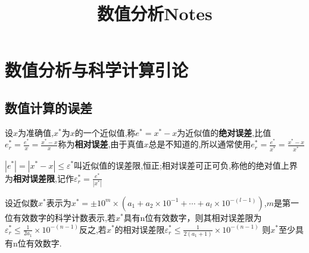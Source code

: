 \documentclass[10pt]{yerbaformat}
\title{数值分析Notes}
\date{}
\begin{document}
\maketitle
\tableofcontents
\footnotesize
\section{数值分析与科学计算引论}
\subsection{数值计算的误差}

\begin{definition}[绝对误差]
    设$x$为准确值,$x^{*}$为$x$的一个近似值,称$e^{*}=x^{*}-x$为近似值的\textbf{绝对误差},比值$e_{r}^{*}=\frac{e^{*}}{x}=\frac{x^{*}-x}{x}$称为\textbf{相对误差},由于真值$x$总是不知道的,所以通常使用$e_{r}^{*}=\frac{e^{*}}{x^{*}}=\frac{x^{*}-x}{x^{*}}$
\end{definition}

\begin{definition}[误差限]
    $\left|e^{*}\right|=\left|x^{*}-x\right|\leq\varepsilon^{*}$叫近似值的误差限,恒正;相对误差可正可负,称他的绝对值上界为\textbf{相对误差限},记作$\varepsilon_{r}^{*}=\frac{e^{*}}{\left|x^{*}\right|}$
\end{definition}

\begin{theorem}[有效数字与相对误差]
    设近似数$x^{*}$表示为$x^{*}=\pm10^{m}\times\left(a_{1}+a_{2}\times10^{-1}+\cdots+a_{l}\times10^{-(l-1)}\right)$,$m$是第一位有效数字的科学计数表示,若$x^{*}$具有n位有效数字，则其相对误差限为$\varepsilon_{r}^{*}\leq\frac{1}{2a_{1}}\times10^{-(n-1)}$反之,若$x^{*}$的相对误差限$\varepsilon_{r}^{*}\leq\frac{1}{2\left(a_{1}+1\right)}\times10^{-(n-1)}$
    则$x^{*}$至少具有n位有效数字.
\end{theorem}
\end{document}
